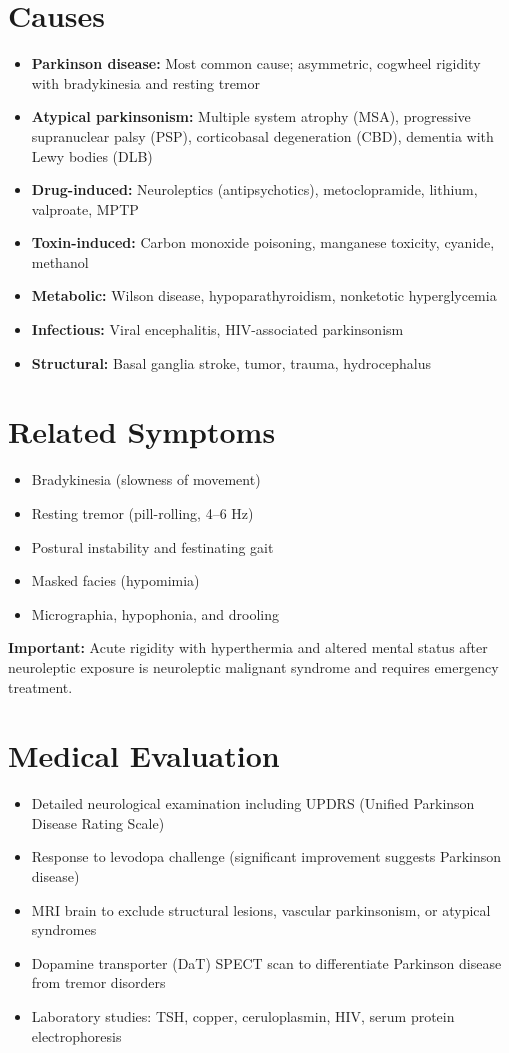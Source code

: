 \section*{Causes}
\begin{itemize}
  \item \textbf{Parkinson disease:} Most common cause; asymmetric, cogwheel rigidity with bradykinesia and resting tremor
  \item \textbf{Atypical parkinsonism:} Multiple system atrophy (MSA), progressive supranuclear palsy (PSP), corticobasal degeneration (CBD), dementia with Lewy bodies (DLB)
  \item \textbf{Drug-induced:} Neuroleptics (antipsychotics), metoclopramide, lithium, valproate, MPTP
  \item \textbf{Toxin-induced:} Carbon monoxide poisoning, manganese toxicity, cyanide, methanol
  \item \textbf{Metabolic:} Wilson disease, hypoparathyroidism, nonketotic hyperglycemia
  \item \textbf{Infectious:} Viral encephalitis, HIV-associated parkinsonism
  \item \textbf{Structural:} Basal ganglia stroke, tumor, trauma, hydrocephalus
\end{itemize}

\section*{Related Symptoms}
\begin{itemize}
  \item Bradykinesia (slowness of movement)
  \item Resting tremor (pill-rolling, 4--6 Hz)
  \item Postural instability and festinating gait
  \item Masked facies (hypomimia)
  \item Micrographia, hypophonia, and drooling
\end{itemize}
\textbf{Important:} Acute rigidity with hyperthermia and altered mental status after neuroleptic exposure is neuroleptic malignant syndrome and requires emergency treatment.

\section*{Medical Evaluation}
\begin{itemize}
  \item Detailed neurological examination including UPDRS (Unified Parkinson Disease Rating Scale)
  \item Response to levodopa challenge (significant improvement suggests Parkinson disease)
  \item MRI brain to exclude structural lesions, vascular parkinsonism, or atypical syndromes
  \item Dopamine transporter (DaT) SPECT scan to differentiate Parkinson disease from tremor disorders
  \item Laboratory studies: TSH, copper, ceruloplasmin, HIV, serum protein electrophoresis
\end{itemize}

